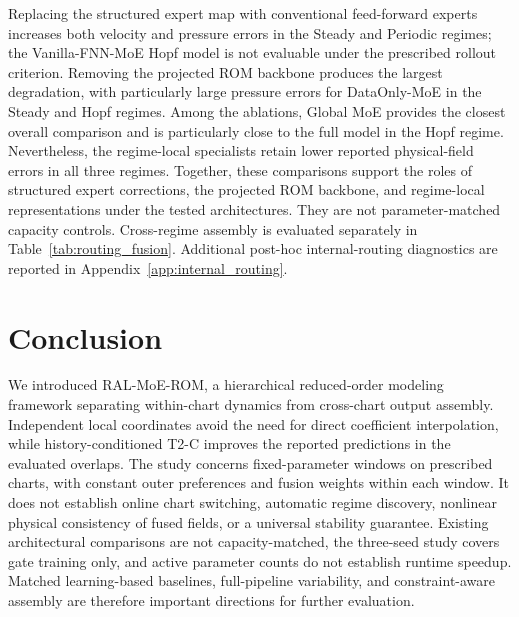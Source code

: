\documentclass{article}
\begin{document}
Replacing the structured expert map with conventional feed-forward experts increases both velocity and pressure errors in the Steady and Periodic regimes; the Vanilla-FNN-MoE Hopf model is not evaluable under the prescribed rollout criterion. Removing the projected ROM backbone produces the largest degradation, with particularly large pressure errors for DataOnly-MoE in the Steady and Hopf regimes. Among the ablations, Global MoE provides the closest overall comparison and is particularly close to the full model in the Hopf regime. Nevertheless, the regime-local specialists retain lower reported physical-field errors in all three regimes. Together, these comparisons support the roles of structured expert corrections, the projected ROM backbone, and regime-local representations under the tested architectures. They are not parameter-matched capacity controls. Cross-regime assembly is evaluated separately in Table~\ref{tab:routing_fusion}. Additional post-hoc internal-routing diagnostics are reported in
Appendix~\ref{app:internal_routing}.



\FloatBarrier
\section{Conclusion}

We introduced RAL-MoE-ROM, a hierarchical reduced-order modeling framework separating within-chart dynamics from cross-chart output assembly. Independent local coordinates avoid the need for direct coefficient interpolation, while history-conditioned T2-C improves the reported predictions in the evaluated overlaps. The study concerns fixed-parameter windows on prescribed charts, with constant outer preferences and fusion weights within each window. It does not establish online chart switching, automatic regime discovery, nonlinear physical consistency of fused fields, or a universal stability guarantee. Existing architectural comparisons are not capacity-matched, the three-seed study covers gate training only, and active parameter counts do not establish runtime speedup. Matched learning-based baselines, full-pipeline variability, and constraint-aware assembly are therefore important directions for further evaluation.
\end{document}
